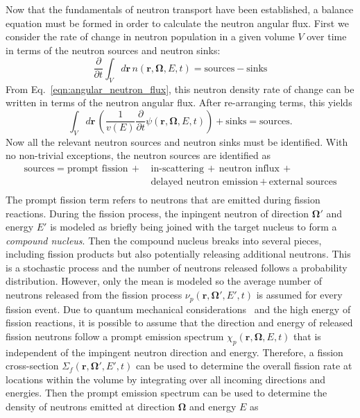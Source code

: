 Now that the fundamentals of neutron transport have been established, a balance equation must be formed in order to calculate the neutron angular flux. First we consider the rate of change in neutron population in a given volume $V$ over time in terms of the neutron sources and neutron sinks:
\begin{equation}
\frac{\partial}{\partial t} \int_V d\mathbf{r} \, n(\mathbf{r},\mathbf{\Omega},E,t) = \text{sources} - \text{sinks}
\end{equation}
From Eq.~\ref{eqn:angular_neutron_flux}, this neutron density rate of change can be written in terms of the neutron angular flux. After re-arranging terms, this yields
\begin{equation}
\int_V d\mathbf{r} \, \left( \frac{1}{v(E)} \frac{\partial}{\partial t} \psi(\mathbf{r},\mathbf{\Omega},E,t)\right) + \text{sinks} = \text{sources}.
\end{equation}
Now all the relevant neutron sources and neutron sinks must be identified. With no non-trivial exceptions, the neutron sources are identified as
\begin{equation}
\begin{split}
\text{sources} = \text{prompt fission} \, + \, & \text{in-scattering} \, +  \, \text{neutron influx} \, + \\ & \text{delayed neutron emission} \, + \, \text{external sources} \\
\end{split}
\end{equation}
The prompt fission term refers to neutrons that are emitted during fission reactions. During the fission process, the inpingent neutron of direction $\mathbf{\Omega'}$ and energy $E'$ is modeled as briefly being joined with the target nucleus to form a \textit{compound nucleus}. Then the compound nucleus breaks into several pieces, including fission products but also potentially releasing additional neutrons. This is a stochastic process and the number of neutrons released follows a probability distribution. However, only the mean is modeled so the average number of neutrons released from the fission process $\nu_p(\mathbf{r},\mathbf{\Omega'}, E', t)$ is assumed for every fission event. Due to quantum mechanical considerations~\cite{compound-nucleus} and the high energy of fission reactions, it is possible to assume that the direction and energy of released fission neutrons follow a prompt emission spectrum $\chi_p(\mathbf{r},\mathbf{\Omega}, E,t)$ that is independent of the impingent neutron direction and energy. Therefore, a fission cross-section $\Sigma_f(\mathbf{r},\mathbf{\Omega'}, E', t)$ can be used to determine the overall fission rate at locations within the volume by integrating over all incoming directions and energies. Then the prompt emission spectrum can be used to determine the density of neutrons emitted at direction $\mathbf{\Omega}$ and energy $E$ as
